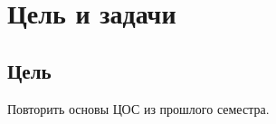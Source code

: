 \chapter*{Цель и задачи}
\label{ch:intro}

\section{Цель}
Повторить основы ЦОС из прошлого семестра.

\endinput